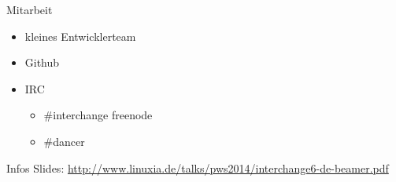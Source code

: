 \begin{frame}{Mitarbeit}
\begin{itemize}
\item kleines Entwicklerteam
\item Github
\item IRC 
\begin{itemize}
\item \#interchange freenode
\item \#dancer
\end{itemize}
\end{itemize}
\end{frame}

\begin{frame}{Infos}
Slides:
\url{http://www.linuxia.de/talks/pws2014/interchange6-de-beamer.pdf}
\end{frame}



